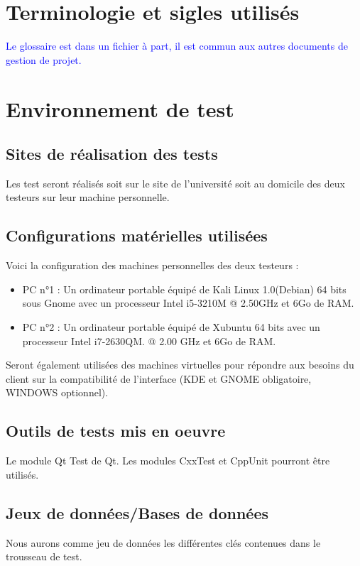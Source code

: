 \documentclass{../res/univ-projet}
\begin{document}
\section{Terminologie et sigles utilisés}
\textcolor{blue}{
  Le glossaire est dans un fichier à part, il est commun aux autres documents de gestion de projet.
}

\section{Environnement de test}
\subsection{Sites de réalisation des tests}
Les test seront réalisés soit sur le site de l'université soit au domicile des deux testeurs sur leur machine personnelle.



\subsection{Configurations matérielles utilisées}
Voici la configuration des machines personnelles des deux testeurs :
\begin{itemize}
 \item PC n°1 : Un ordinateur portable équipé de Kali Linux 1.0(Debian) 64 bits sous Gnome avec un processeur Intel i5-3210M @ 2.50GHz et 6Go de RAM.
 \item PC n°2 : Un ordinateur portable équipé de Xubuntu 64 bits avec un processeur Intel i7-2630QM.
 @ 2.00 GHz et 6Go de RAM.
\end{itemize}
Seront également utilisées des machines virtuelles pour répondre aux besoins du client sur la compatibilité de l'interface (KDE et GNOME obligatoire,
WINDOWS optionnel).

\subsection{Outils de tests mis en oeuvre}
Le module Qt Test de Qt.
Les modules CxxTest et CppUnit pourront être utilisés.

\subsection{Jeux de données/Bases de données}
Nous aurons comme jeu de données les différentes clés contenues dans le trousseau de test.
\end{document}
